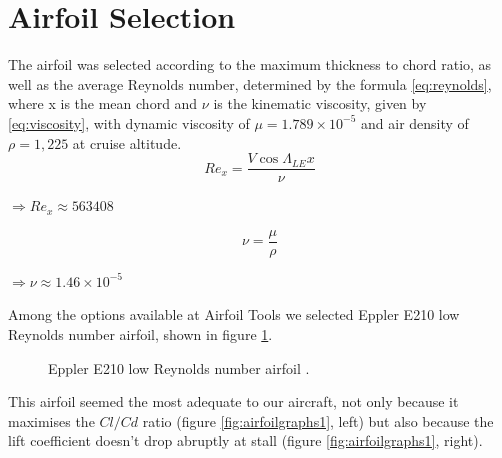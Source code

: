 \documentclass[english,fira]{ist-report}
\begin{document}
\section{Airfoil Selection}
The airfoil was selected according to the maximum thickness to chord ratio, as well as the average Reynolds number, determined by the formula \ref{eq:reynolds}, where x is the mean chord and $\nu$ is the kinematic viscosity, given by \ref{eq:viscosity}, with dynamic viscosity of $\mu= 1.789\times 10^{-5}$ and air density of $\rho=1,225$ at cruise altitude.
\begin{equation} \label{eq:reynolds}
    Re_x=\frac{V\cos{\Lambda_{LE}}x}{\nu}
\end{equation}
\begin{center}
    $\Rightarrow Re_x \approx 563408 $
\end{center} \par
\begin{equation} \label{eq:viscosity}
    \nu = \frac{\mu}{\rho}
\end{equation}
\begin{center}
    $\Rightarrow \nu \approx 1.46\times 10^{-5} $
\end{center}

Among the options available at Airfoil Tools \cite{e210} we selected Eppler E210 low Reynolds number airfoil, shown in figure \ref{fig:e210_profile}.

\begin{figure}[ht]
    \centering
    \caption{Eppler E210 low Reynolds number airfoil \cite{e210}.}
    \label{fig:e210_profile}
\end{figure}

This airfoil seemed the most adequate to our aircraft, not only because it maximises the $Cl/Cd$ ratio (figure \ref{fig:airfoilgraphs1}, left) but also because the lift coefficient doesn’t drop abruptly at stall (figure \ref{fig:airfoilgraphs1}, right).
\end{document}
